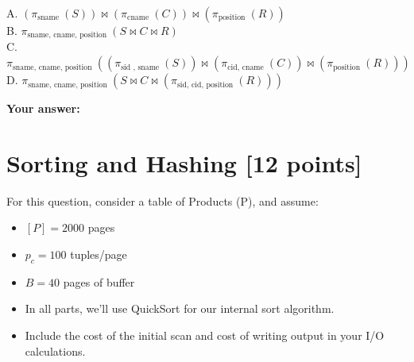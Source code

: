 \documentclass[10pt]{article}
\begin{document}
\begin{enumerate}
	      A. $\left(\pi_{\text{sname }}(S)\right)\bowtie\left(\pi_{\text{cname }}(C)\right)\bowtie\left(\pi_{\text{position }}(R)\right)$\\
	      B. $\pi_{\text{sname, cname, position }}(S\bowtie C\bowtie R)$\\
	      C. $\pi_{\text{sname, cname, position }}\left(\left(\pi_{\text{sid },\text{ sname }}(S)\right)\bowtie\left(\pi_{\text{cid, cname }}(C)\right)\bowtie\left(\pi_{\text{position }}(R)\right)\right)$\\
	      D. $\pi_{\text{sname, cname, position }}\left(S\bowtie C\bowtie\left(\pi_{\text{sid, cid, position }}(R)\right)\right)$\\
\end{enumerate}
\textbf{Your answer:}


\newpage
\section{Sorting and Hashing \textbf{[12 points]}}
For this question, consider a table of Products (P), and assume:
\begin{itemize}
	\item $[P] = 2000$ pages
	\item $p_c = 100$ tuples/page
	\item $B = 40$ pages of buffer
	\item In all parts, we’ll use QuickSort for our internal sort algorithm.
	\item Include the cost of the initial scan and cost of writing output in your I/O calculations.
\end{itemize}
\end{document}
